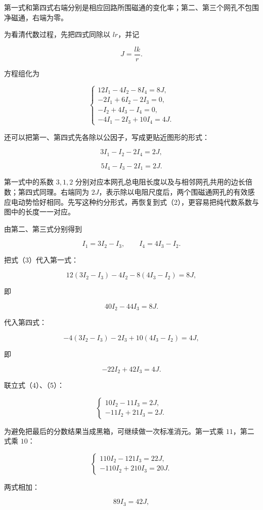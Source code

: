 \documentclass[12pt,a4paper,UTF8]{ctexart}
\begin{document}
第一式和第四式右端分别是相应回路所围磁通的变化率；第二、第三个网孔不包围净磁通，右端为零。

为看清代数过程，先把四式同除以 \(lr\)，并记

\[J=\frac{lk}{r}.\]

方程组化为

\[\begin{cases}
12I_1-4I_2-8I_4=8J,\\
-2I_1+6I_2-2I_3=0,\\
-I_2+4I_3-I_4=0,\\
-4I_1-2I_3+10I_4=4J.
\end{cases} \tag{2}\]

还可以把第一、第四式先各除以公因子，写成更贴近图形的形式：

\[3I_1-I_2-2I_4=2J,\]

\[5I_4-I_3-2I_1=2J.\]

第一式中的系数 \(3,1,2\)
分别对应本网孔总电阻长度以及与相邻网孔共用的边长倍数；第四式同理。右端同为
\(2J\)，表示除以电阻尺度后，两个围磁通网孔的有效感应电动势恰好相同。先写这种约分形式，再恢复到式（2），更容易把纯代数系数与图中的长度一一对应。

由第二、第三式分别得到

\[I_1=3I_2-I_3,\qquad I_4=4I_3-I_2. \tag{3}\]

把式（3）代入第一式：

\[12(3I_2-I_3)-4I_2-8(4I_3-I_2)=8J,\]

即

\[40I_2-44I_3=8J. \tag{4}\]

代入第四式：

\[-4(3I_2-I_3)-2I_3+10(4I_3-I_2)=4J,\]

即

\[-22I_2+42I_3=4J. \tag{5}\]

联立式（4）、（5）：

\[\begin{cases}
10I_2-11I_3=2J,\\
-11I_2+21I_3=2J.
\end{cases}\]

为避免把最后的分数结果当成黑箱，可继续做一次标准消元。第一式乘
\(11\)，第二式乘 \(10\)：

\[\begin{cases}
110I_2-121I_3=22J,\\
-110I_2+210I_3=20J.
\end{cases}\]

两式相加：

\[89I_3=42J,\]
\end{document}
